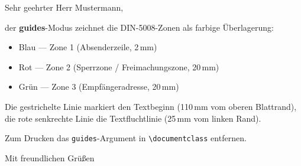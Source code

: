 \documentclass[guides, lang=german]{../onlinebrief24}
\begin{document}
\begin{letter}{}
\opening{Sehr geehrter Herr Mustermann,}

der \textbf{guides}-Modus zeichnet die DIN-5008-Zonen als farbige Überlagerung:

\begin{itemize}
  \item \textcolor{blue!60}{Blau} — Zone 1 (Absenderzeile, 2\,mm)
  \item \textcolor{red!60}{Rot} — Zone 2 (Sperrzone / Freimachungszone, 20\,mm)
  \item \textcolor{green!60}{Grün} — Zone 3 (Empfängeradresse, 20\,mm)
\end{itemize}

Die gestrichelte Linie markiert den Textbeginn (110\,mm vom oberen Blattrand),
die rote senkrechte Linie die Textfluchtlinie (25\,mm vom linken Rand).

Zum Drucken das \texttt{guides}-Argument in
\verb|\documentclass| entfernen.

\closing{Mit freundlichen Grüßen}
\end{letter}
\end{document}
